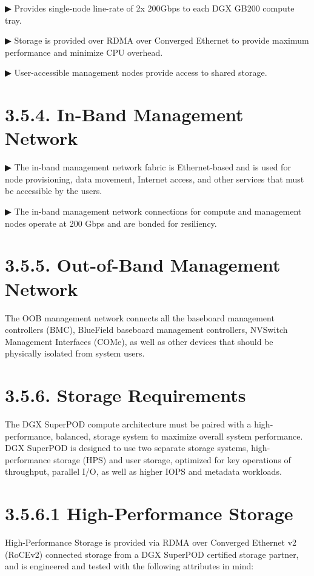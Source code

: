 \documentclass[
  10
]{article}
\begin{document}
▶ Provides single-node line-rate of 2x 200Gbps to each DGX GB200 compute
tray.

▶ Storage is provided over RDMA over Converged Ethernet to provide
maximum performance and minimize CPU overhead.

▶ User-accessible management nodes provide access to shared storage.

\section{3.5.4. In-Band Management
Network}\label{in-band-management-network}

▶ The in-band management network fabric is Ethernet-based and is used
for node provisioning, data movement, Internet access, and other
services that must be accessible by the users.

▶ The in-band management network connections for compute and management
nodes operate at 200 Gbps and are bonded for resiliency.

\section{3.5.5. Out-of-Band Management
Network}\label{out-of-band-management-network}

The OOB management network connects all the baseboard management
controllers (BMC), BlueField baseboard management controllers, NVSwitch
Management Interfaces (COMe), as well as other devices that should be
physically isolated from system users.

\section{3.5.6. Storage Requirements}\label{storage-requirements}

The DGX SuperPOD compute architecture must be paired with a
high-performance, balanced, storage system to maximize overall system
performance. DGX SuperPOD is designed to use two separate storage
systems, high-performance storage (HPS) and user storage, optimized for
key operations of throughput, parallel I/O, as well as higher IOPS and
metadata workloads.

\section{3.5.6.1 High-Performance
Storage}\label{high-performance-storage}

High-Performance Storage is provided via RDMA over Converged Ethernet v2
(RoCEv2) connected storage from a DGX SuperPOD certified storage
partner, and is engineered and tested with the following attributes in
mind:
\end{document}
